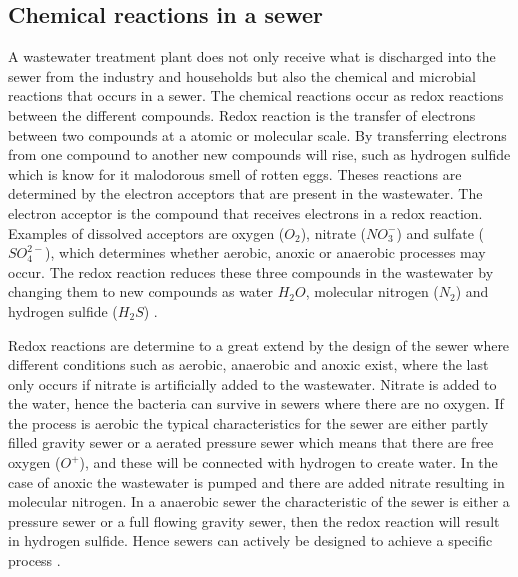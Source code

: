 \subsection{Chemical reactions in a sewer}\label{subse:chemical_reactions_in_a_sewer}
A wastewater treatment plant does not only receive what is discharged into the sewer from the industry and households but also the chemical and microbial reactions that occurs in a sewer. The chemical reactions occur as redox reactions between the different compounds. Redox reaction is the transfer of electrons between two compounds at a atomic or molecular scale. By transferring electrons from one compound to another new compounds will rise, such as hydrogen sulfide which is know for it malodorous smell of rotten eggs. Theses reactions are determined by the electron acceptors that are present in the wastewater. The electron acceptor is the compound that receives electrons in a redox reaction. Examples of dissolved acceptors are oxygen ($O_2$), nitrate ($NO^-_3$) and sulfate ($SO^{2-}_4$), which determines whether aerobic, anoxic or anaerobic processes may occur. The redox reaction reduces these three compounds in the wastewater by changing them to new compounds as water $H_2O$, molecular nitrogen ($N_2$) and hydrogen sulfide ($H_2S$) \cite{Sewer_processes}. 

Redox reactions are determine to a great extend by the design of the sewer where different conditions such as aerobic, anaerobic and anoxic exist, where the last only occurs if nitrate is artificially added to the wastewater. Nitrate is added to the water, hence the bacteria can survive in sewers where there are no oxygen. If the process is aerobic the typical characteristics for the sewer are either partly filled gravity sewer or a aerated pressure sewer which means that there are free oxygen ($O^+$), and these will be connected with hydrogen to create water. In the case of anoxic the wastewater is pumped and there are added nitrate resulting in molecular nitrogen. In a anaerobic sewer the characteristic of the sewer is either a pressure sewer or a full flowing gravity sewer, then the redox reaction will result in hydrogen sulfide. Hence sewers can actively be designed to achieve a specific process \cite{Sewer_processes}. 

